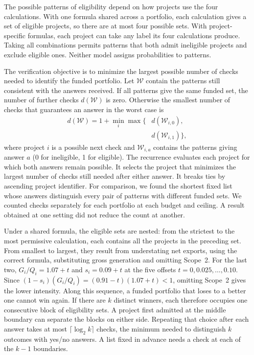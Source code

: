 The possible patterns of eligibility depend on how projects use the four calculations. With one formula shared across a portfolio, each calculation gives a set of eligible projects, so there are at most four possible sets. With project-specific formulas, each project can take any label its four calculations produce. Taking all combinations permits patterns that both admit ineligible projects and exclude eligible ones. Neither model assigns probabilities to patterns.

The verification objective is to minimize the largest possible number of checks needed to identify the funded portfolio. Let $\mathcal W$ contain the patterns still consistent with the answers received. If all patterns give the same funded set, the number of further checks $d(\mathcal W)$ is zero. Otherwise the smallest number of checks that guarantees an answer in the worst case is
\begin{equation}
\begin{aligned}
 d(\mathcal W)=1+\min_i\max\{&d(\mathcal W_{i,0}),\\ &d(\mathcal W_{i,1})\},
 \end{aligned}\label{eq:tree}
\end{equation}
where project $i$ is a possible next check and $\mathcal W_{i,a}$ contains the patterns giving answer $a$ (0 for ineligible, 1 for eligible). The recurrence evaluates each project for which both answers remain possible. It selects the project that minimizes the largest number of checks still needed after either answer. It breaks ties by ascending project identifier. For comparison, we found the shortest fixed list whose answers distinguish every pair of patterns with different funded sets. We counted checks separately for each portfolio at each budget and ceiling. A result obtained at one setting did not reduce the count at another.

Under a shared formula, the eligible sets are nested: from the strictest to the most permissive calculation, each contains all the projects in the preceding set. From smallest to largest, they result from understating net exports, using the correct formula, substituting gross generation and omitting Scope~2. For the last two, $G_i/Q_i=1.07+t$ and $s_i=0.09+t$ at the five offsets $t=0,0.025,\ldots,0.10$. Since $(1-s_i)(G_i/Q_i)=(0.91-t)(1.07+t)<1$, omitting Scope~2 gives the lower intensity. Along this sequence, a funded portfolio that loses to a better one cannot win again. If there are $k$ distinct winners, each therefore occupies one consecutive block of eligibility sets. A project first admitted at the middle boundary can separate the blocks on either side. Repeating that choice after each answer takes at most $\lceil\log_2 k\rceil$ checks, the minimum needed to distinguish $k$ outcomes with yes/no answers. A list fixed in advance needs a check at each of the $k-1$ boundaries.

